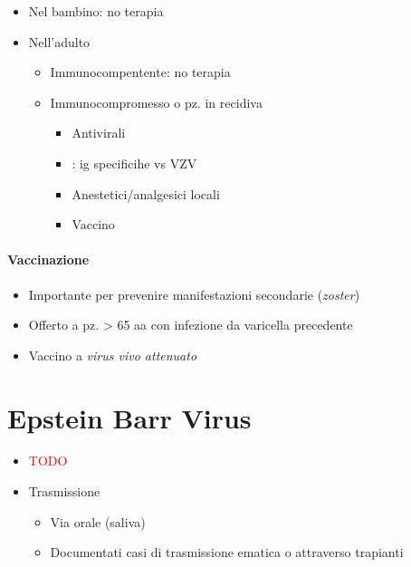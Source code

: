 \documentclass[italian,]{article}
\providecommand{\tightlist}{%
  \setlength{\itemsep}{0pt}\setlength{\parskip}{0pt}}
\newcommand{\far}[1]{ \fbox{\textsc{#1}} } %
\newcommand{\TODO}[1]{\textcolor{red}{\textsf{\footnotesize{TODO #1}}}} %
\begin{document}
\begin{itemize}
\tightlist
\item
  Nel bambino: no terapia
\item
  Nell'adulto

  \begin{itemize}
  \tightlist
  \item
    Immunocompentente: no terapia
  \item
    Immunocompromesso o pz. in recidiva

    \begin{itemize}
    \tightlist
    \item
      Antivirali
    \item
      \far{vzig}: ig specificihe vs VZV
    \item
      Anestetici/analgesici locali
    \item
      Vaccino
    \end{itemize}
  \end{itemize}
\end{itemize}

\hypertarget{vaccinazione-1}{%
\paragraph{Vaccinazione}\label{vaccinazione-1}}

\begin{itemize}
\tightlist
\item
  Importante per prevenire manifestazioni secondarie (\emph{zoster})
\item
  Offerto a pz. \textgreater{} 65 aa con infezione da varicella
  precedente
\item
  Vaccino a \emph{virus vivo attenuato}
\end{itemize}

\hypertarget{epstein-barr-virus}{%
\section{Epstein Barr Virus}\label{epstein-barr-virus}}

\begin{itemize}
\item
  \TODO{}
\item
  Trasmissione

  \begin{itemize}
  \tightlist
  \item
    Via orale (saliva)
  \item
    Documentati casi di trasmissione ematica o attraverso trapianti
  \end{itemize}
\end{itemize}
\end{document}
